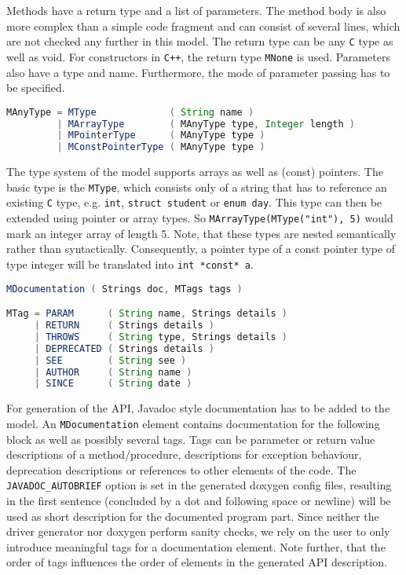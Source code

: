 \documentclass{report}
\begin{document}
Methods have a return type and a list of parameters. The method body is also more complex than a simple code fragment and can consist of several lines, which are not checked any further in this model. The return type can be any \texttt{C} type as well as void. For constructors in \texttt{C++}, the return type \texttt{MNone} is used. Parameters also have a type and name. Furthermore, the mode of parameter passing has to be specified.

\begin{lstlisting}[language=java, breaklines=true]
MAnyType = MType             ( String name )
         | MArrayType        ( MAnyType type, Integer length )
         | MPointerType      ( MAnyType type )
         | MConstPointerType ( MAnyType type )
\end{lstlisting}

The type system of the model supports arrays as well as (const) pointers. The basic type is the \texttt{MType}, which consists only of a string that has to reference an existing \texttt{C} type, e.g. \texttt{int}, \texttt{struct student} or \texttt{enum day}. This type can then be extended using pointer or array types. So \texttt{MArrayType(MType("int"), 5)} would mark an integer array of length 5. Note, that these types are nested semantically rather than syntactically. Consequently, a pointer type of a const pointer type of type integer will be translated into \texttt{int *const* a}. %

\begin{lstlisting}[language=java, breaklines=true]
MDocumentation ( Strings doc, MTags tags )

MTag = PARAM      ( String name, Strings details )
     | RETURN     ( Strings details )
     | THROWS     ( String type, Strings details )
     | DEPRECATED ( Strings details ) 
     | SEE        ( String see )
     | AUTHOR     ( String name )
     | SINCE      ( String date )
\end{lstlisting}

For generation of the API, Javadoc style documentation has to be added to the model. An \texttt{MDocumentation} element contains documentation for the following block as well as possibly several tags. Tags can be parameter or return value descriptions of a method/procedure, descriptions for exception behaviour, deprecation descriptions or references to other elements of the code. The \texttt{JAVADOC\_AUTOBRIEF} option is set in the generated doxygen config files, resulting in the first sentence (concluded by a dot and following space or newline) will be used as short description for the documented program part. Since neither the driver generator nor doxygen perform sanity checks, we rely on the user to only introduce meaningful tags for a documentation element. Note further, that the order of tags influences the order of elements in the generated API description.
\end{document}
